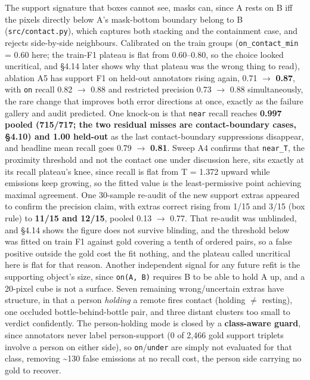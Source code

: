 The support signature that boxes cannot see, masks can, since A rests on B iff the pixels directly below A's mask-bottom boundary belong to B (\texttt{src/contact.py}), which captures both stacking and the containment case, and rejects side-by-side neighbours. Calibrated on the train groups (\texttt{on\_\allowbreak{}contact\_\allowbreak{}min} = 0.60 here; the train-F1 plateau is flat from 0.60--0.80, so the choice looked uncritical, and \S{}4.14 later shows why that plateau was the wrong thing to read), ablation A5 has support F1 on held-out annotators rising again, 0.71 $\rightarrow$ \textbf{0.87}, with \texttt{on} recall 0.82 $\rightarrow$ 0.88 and restricted precision 0.73 $\rightarrow$ 0.88 simultaneously, the rare change that improves both error directions at once, exactly as the failure gallery and audit predicted. One knock-on is that \texttt{near} recall reaches \textbf{0.997 pooled (715/717; the two residual misses are contact-boundary cases, \S{}4.10) and 1.00 held-out} as the last contact-boundary suppressions disappear, and headline mean recall goes 0.79 $\rightarrow$ \textbf{0.81}. Sweep A4 confirms that \texttt{near\_\allowbreak{}T}, the proximity threshold and not the contact one under discussion here, sits exactly at its recall plateau's knee, since recall is flat from T = 1.372 upward while emissions keep growing, so the fitted value is the least-permissive point achieving maximal agreement. One 30-sample re-audit of the new support extras appeared to confirm the precision claim, with extras correct rising from 1/15 and 3/15 (box rule) to \textbf{11/15 and 12/15}, pooled 0.13 $\rightarrow$ 0.77. That re-audit was unblinded, and \S{}4.14 shows the figure does not survive blinding, and the threshold below was fitted on train F1 against gold covering a tenth of ordered pairs, so a false positive outside the gold cost the fit nothing, and the plateau called uncritical here is flat for that reason. Another independent signal for any future refit is the supporting object's size, since \texttt{on(A, B)} requires B to be able to hold A up, and a 20-pixel cube is not a surface. Seven remaining wrong/uncertain extras have structure, in that a person \textit{holding} a remote fires contact (holding $\neq$ resting), one occluded bottle-behind-bottle pair, and three distant clusters too small to verdict confidently. The person-holding mode is closed by a \textbf{class-aware guard}, since annotators never label person-support (0 of 2,466 gold support triplets involve a person on either side), so \texttt{on}/\texttt{under} are simply not evaluated for that class, removing \textasciitilde{}130 false emissions at no recall cost, the person side carrying no gold to recover.

